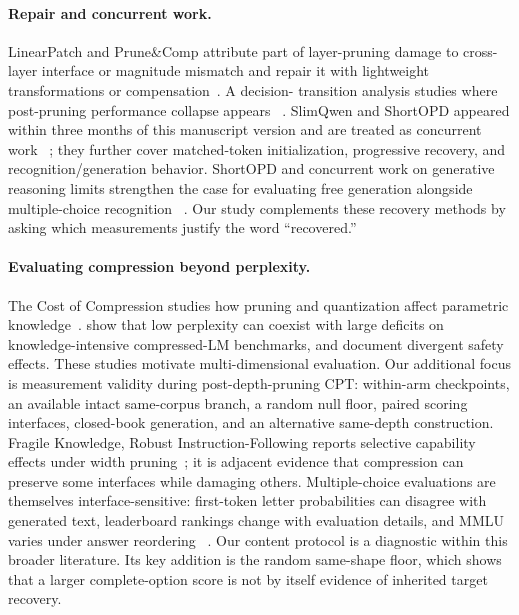 \paragraph{Repair and concurrent work.}
LinearPatch and Prune\&Comp attribute part of layer-pruning damage to
cross-layer interface or magnitude mismatch and repair it with lightweight
transformations or compensation~\citep{linearpatch,prunecomp}. A decision-
transition analysis studies where post-pruning performance collapse appears
~\citep{decisioncollapse}. SlimQwen and ShortOPD appeared within three months of
this manuscript version and are treated as concurrent work
~\citep{slimqwen,shortopd}; they further cover matched-token initialization,
progressive recovery, and recognition/generation behavior. ShortOPD and
concurrent work on generative reasoning limits strengthen the case for
evaluating free generation alongside multiple-choice recognition
~\citep{limitsgenerativereasoning}. Our study complements these recovery
methods by asking which measurements justify the word ``recovered.''

\paragraph{Evaluating compression beyond perplexity.}
The Cost of Compression studies how pruning and quantization affect parametric
knowledge~\citep{costcompression}. \citet{jaiswal2024truth} show that low
perplexity can coexist with large deficits on knowledge-intensive compressed-LM
benchmarks, and \citet{beyondperplexity} document divergent safety effects.
These studies motivate multi-dimensional evaluation. Our additional focus is
measurement validity during post-depth-pruning CPT: within-arm checkpoints, an
available intact same-corpus branch, a random null floor, paired scoring
interfaces, closed-book generation, and an alternative same-depth
construction.
Fragile Knowledge, Robust Instruction-Following reports selective capability
effects under width pruning~\citep{fragileknowledge}; it is adjacent evidence
that compression can preserve some interfaces while damaging others.
Multiple-choice evaluations are themselves interface-sensitive: first-token
letter probabilities can disagree with generated text, leaderboard rankings
change with evaluation details, and MMLU varies under answer reordering
~\citep{myanswerisc,benchmarktargets,answerorder}. Our content protocol is a
diagnostic within this broader literature. Its key addition is the random
same-shape floor, which shows that a larger complete-option score is not by
itself evidence of inherited target recovery.
